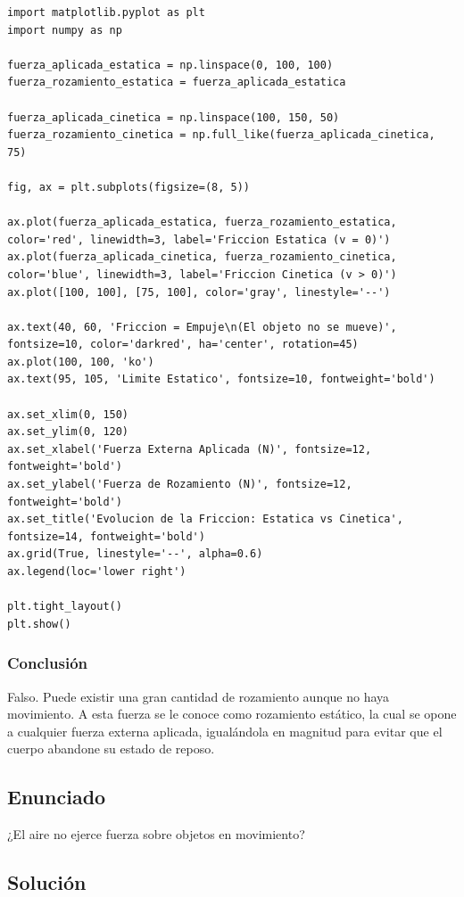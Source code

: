 \documentclass[12pt]{article}
\begin{document}
\begin{lstlisting}
import matplotlib.pyplot as plt
import numpy as np

fuerza_aplicada_estatica = np.linspace(0, 100, 100)
fuerza_rozamiento_estatica = fuerza_aplicada_estatica

fuerza_aplicada_cinetica = np.linspace(100, 150, 50)
fuerza_rozamiento_cinetica = np.full_like(fuerza_aplicada_cinetica, 75)

fig, ax = plt.subplots(figsize=(8, 5))

ax.plot(fuerza_aplicada_estatica, fuerza_rozamiento_estatica, color='red', linewidth=3, label='Friccion Estatica (v = 0)')
ax.plot(fuerza_aplicada_cinetica, fuerza_rozamiento_cinetica, color='blue', linewidth=3, label='Friccion Cinetica (v > 0)')
ax.plot([100, 100], [75, 100], color='gray', linestyle='--')

ax.text(40, 60, 'Friccion = Empuje\n(El objeto no se mueve)', fontsize=10, color='darkred', ha='center', rotation=45)
ax.plot(100, 100, 'ko')
ax.text(95, 105, 'Limite Estatico', fontsize=10, fontweight='bold')

ax.set_xlim(0, 150)
ax.set_ylim(0, 120)
ax.set_xlabel('Fuerza Externa Aplicada (N)', fontsize=12, fontweight='bold')
ax.set_ylabel('Fuerza de Rozamiento (N)', fontsize=12, fontweight='bold')
ax.set_title('Evolucion de la Friccion: Estatica vs Cinetica', fontsize=14, fontweight='bold')
ax.grid(True, linestyle='--', alpha=0.6)
ax.legend(loc='lower right')

plt.tight_layout()
plt.show()
\end{lstlisting}

\subsubsection*{Conclusión}
Falso. Puede existir una gran cantidad de rozamiento aunque no haya movimiento. A esta fuerza se le conoce como rozamiento estático, la cual se opone a cualquier fuerza externa aplicada, igualándola en magnitud para evitar que el cuerpo abandone su estado de reposo.

\newpage

\subsection*{Enunciado}
¿El aire no ejerce fuerza sobre objetos en movimiento?

\subsection*{Solución}
\end{document}
